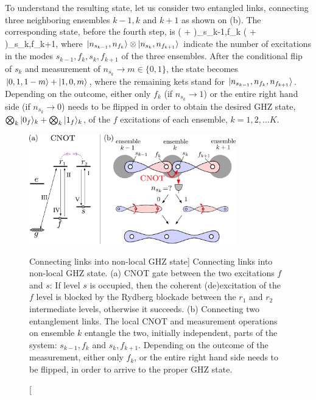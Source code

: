 To understand the resulting state, let us consider two
entangled links, connecting three neighboring ensembles $k-1,k$ and
$k+1$ as shown on (b). The corresponding state, before
the fourth step, is
\bel 
	\big( + \big)_{s_{k-1},f_k}
	\otimes
	\big(   +   \big)_{s_k,f_{k+1}},
\eel
where $| n_{s_{k-1}}, n_{f_k} \rangle\otimes| n_{s_k},n_{f_{k+1}} \rangle$ indicate the
number of excitations in the modes $s_{k-1}, f_k, s_k, f_{k+1}$ of the three
ensembles.
After the conditional flip of $s_k$ and measurement of $n_{s_k} \rightarrow m
\in \{0,1\}$, the state becomes $| 0,1, 1-m \rangle + | 1,0,m \rangle$, where the
remaining kets stand for $| n_{s_{k-1}}, n_{f_k}, n_{f_{k+1}} \rangle$.
Depending on the outcome, either only $f_k$ (if $n_{s_k} \rightarrow 1$) or the
entire right hand side (if $n_{s_k} \rightarrow 0$) needs to be flipped in order
to obtain the desired GHZ state, $\bigotimes_k | 0_f \rangle_k + \bigotimes_k
| 1_f \rangle_k$, of the $f$ excitations of each ensemble, $k = 1,2,\dots K$.
\begin{figure}
\centering
\includegraphics[width=0.8\textwidth]{./figs_Komar2015/connection_6.pdf}
\caption
[Connecting links into non-local GHZ state]
{
\label{fig:connection} 
Connecting links into non-local GHZ state.
(a) CNOT gate between
the two excitations $f$ and $s$: If level $s$ is occupied, then the coherent
(de)excitation of the $f$ level is blocked by the Rydberg blockade between
the $r_1$ and $r_2$ intermediate levels, otherwise it succeeds. 
(b) Connecting two entanglement links. The local CNOT and measurement
operations on ensemble $k$ entangle the two, initially independent, parts of
the system:
$s_{k-1}, f_k$ and $s_k, f_{k+1}$. Depending on the
outcome of the measurement, either only $f_k$, or the entire
right hand side needs to be flipped, in order to arrive to the proper GHZ
state.}
\end{figure} 


